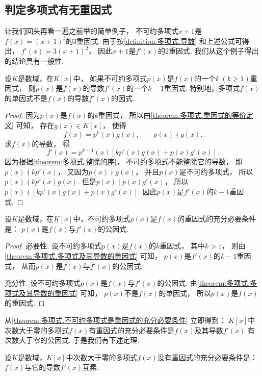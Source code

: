 \subsection{判定多项式有无重因式}
让我们回头再看一遍之前举的简单例子，
不可约多项式\(x+1\)是\(f(x) = (x+1)^3\)的\(3\)重因式.
由于按\cref{definition:多项式.导数} 和上述公式可得出，
\(f'(x) = 3(x+1)^2\)，
因此\(x+1\)是\(f'(x)\)的\(2\)重因式.
我们从这个例子得出的结论具有一般性.

\begin{theorem}\label{theorem:多项式.多项式及其导数的重因式}
设\(K\)是数域，在\(K[x]\)中，
如果不可约多项式\(p(x)\)是\(f(x)\)的一个\(k\ (k\geq1)\)重因式，
则\(p(x)\)是\(f(x)\)的导数\(f'(x)\)的一个\(k-1\)重因式.
特别地，多项式\(f(x)\)的单因式不是\(f(x)\)的导数\(f'(x)\)的因式.
\begin{proof}
因为\(p(x)\)是\(f(x)\)的\(k\)重因式，
所以由\cref{theorem:多项式.重因式的等价定义} 可知，
存在\(g(x) \in K[x]\)，
使得\begin{equation*}
	f(x) = p^k(x) g(x), \qquad
	p(x) \nmid g(x).
\end{equation*}
求\(f(x)\)的导数，
得\begin{equation*}
	f'(x) = p^{k-1}(x) [ k p'(x) g(x) + p(x) g'(x) ].
\end{equation*}
因为根据\cref{theorem:多项式.整除的序}，
不可约多项式不能整除它的导数，
即\(p(x) \nmid k p'(x)\)，
又因为\(p(x) \nmid g(x)\)，
并且\(p(x)\)是不可约多项式，
所以\(p(x) \nmid k p'(x) g(x)\).
但是\(p(x) \mid p(x) g'(x)\)，
所以\(p(x) \nmid [k p'(x) g(x) + p(x) g'(x)]\).
因此\(p(x)\)是\(f'(x)\)的\(k-1\)重因式.
\end{proof}
\end{theorem}

\begin{corollary}\label{theorem:多项式.不可约多项式是重因式的充分必要条件}
设\(K\)是数域，在\(K[x]\)中，不可约多项式\(p(x)\)是\(f(x)\)的重因式的充分必要条件是：
\(p(x)\)是\(f(x)\)与\(f'(x)\)的公因式.
\begin{proof}
必要性.
设不可约多项式\(p(x)\)是\(f(x)\)的\(k\)重因式，
其中\(k>1\)，
则由\cref{theorem:多项式.多项式及其导数的重因式} 可知，
\(p(x)\)是\(f'(x)\)的\(k-1\)重因式，
从而\(p(x)\)是\(f(x)\)与\(f'(x)\)的公因式.

充分性.
设不可约多项式\(p(x)\)是\(f(x)\)与\(f'(x)\)的公因式.
由\cref{theorem:多项式.多项式及其导数的重因式} 可知，
\(p(x)\)不是\(f(x)\)的单因式，
所以\(p(x)\)是\(f(x)\)的重因式.
\end{proof}
\end{corollary}
从\cref{theorem:多项式.不可约多项式是重因式的充分必要条件} 立即得到：
\(K[x]\)中次数大于零的多项式\(f(x)\)有重因式的充分必要条件是\(f(x)\)及其导数\(f'(x)\)
有次数大于零的公因式.
于是我们有下述定理.
\begin{theorem}\label{theorem:多项式.高次多项式没有重因式的充分必要条件}
设\(K\)是数域，\(K[x]\)中次数大于零的多项式\(f(x)\)没有重因式的充分必要条件是：
\(f(x)\)与它的导数\(f'(x)\)互素.
\end{theorem}

